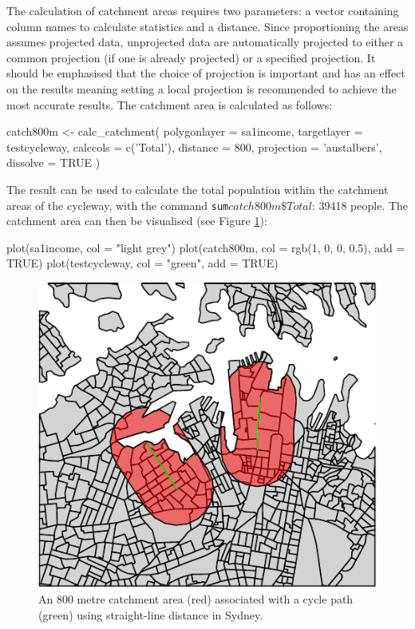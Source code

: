 The calculation of catchment areas requires two parameters:
a vector containing column names
to calculate statistics and a distance. Since proportioning
the areas assumes projected data, unprojected data are automatically
projected to either a common projection (if one is already projected) or
a specified projection. It should be emphasised that the choice of
projection is important and has an effect on the results meaning setting
a local projection is recommended to achieve the most accurate results.
The catchment area is calculated as follows:

\begin{Schunk}
\begin{Sinput}
catch800m <- calc_catchment(
  polygonlayer = sa1income,
  targetlayer = testcycleway,
  calccols = c('Total'),
  distance = 800,
  projection = 'austalbers',
  dissolve = TRUE
)
\end{Sinput}
\end{Schunk}

The result can be used to calculate the total population within the
catchment areas of the cycleway, with the command \texttt{sum\(catch800m\$Total\)}: 39418 people.
The catchment area can then be visualised (see
Figure \ref{fig:catchmentplot}):

\begin{Schunk}
\begin{Sinput}
plot(sa1income, col = "light grey")
plot(catch800m, col = rgb(1, 0, 0, 0.5), add = TRUE)
plot(testcycleway, col = "green", add = TRUE)
\end{Sinput}
\begin{figure}
\includegraphics[center]{catchmentplot-1} \caption[An 800 metre catchment area (red) associated with a cycle path (green) using straight-line distance in Sydney]{An 800 metre catchment area (red) associated with a cycle path (green) using straight-line distance in Sydney.}\label{fig:catchmentplot}
\end{figure}
\end{Schunk}

